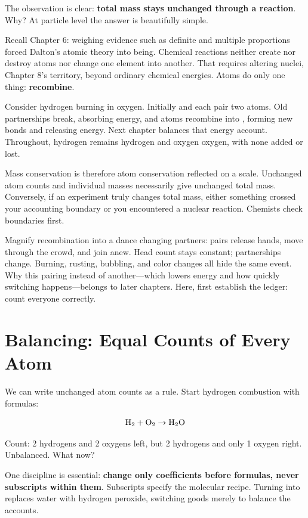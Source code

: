 The observation is clear: \textbf{total mass stays unchanged through a reaction}. Why? At particle level the answer is beautifully simple.

Recall Chapter 6: weighing evidence such as definite and multiple proportions forced Dalton's atomic theory into being. Chemical reactions neither create nor destroy atoms nor change one element into another. That requires altering nuclei, Chapter 8's territory, beyond ordinary chemical energies. Atoms do only one thing: \textbf{recombine}.

Consider hydrogen burning in oxygen. Initially  and  each pair two atoms. Old partnerships break, absorbing energy, and atoms recombine into , forming new bonds and releasing energy. Next chapter balances that energy account. Throughout, hydrogen remains hydrogen and oxygen oxygen, with none added or lost.

Mass conservation is therefore atom conservation reflected on a scale. Unchanged atom counts and individual masses necessarily give unchanged total mass. Conversely, if an experiment truly changes total mass, either something crossed your accounting boundary or you encountered a nuclear reaction. Chemists check boundaries first.

Magnify recombination into a dance changing partners: pairs release hands, move through the crowd, and join anew. Head count stays constant; partnerships change. Burning, rusting, bubbling, and color changes all hide the same event. Why this pairing instead of another---which lowers energy and how quickly switching happens---belongs to later chapters. Here, first establish the ledger: count everyone correctly.

\section{Balancing: Equal Counts of Every Atom}

We can write unchanged atom counts as a rule. Start hydrogen combustion with formulas:

\[\mathrm{H_2} + \mathrm{O_2} \rightarrow \mathrm{H_2O}\]

Count: 2 hydrogens and 2 oxygens left, but 2 hydrogens and only 1 oxygen right. Unbalanced. What now?

One discipline is essential: \textbf{change only coefficients before formulas, never subscripts within them}. Subscripts specify the molecular recipe. Turning  into  replaces water with hydrogen peroxide, switching goods merely to balance the accounts.


